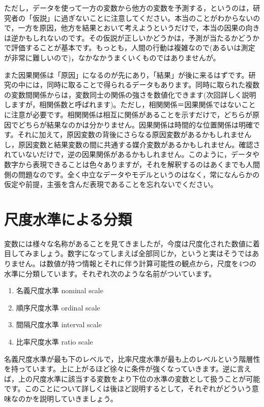 \documentclass{ltjsbook}
\begin{document}
ただし，データを使って一方の変数から他方の変数を予測する，というのは，研究者の「仮説」に過ぎないことに注意してください。本当のことがわからないので，一方を原因，他方を結果とおいて考えようというだけで，本当の因果の向きは逆かもしれないのです。その仮説が正しいかどうかは，予測が当たるかどうかで評価することが基本です。もっとも，人間の行動は複雑なので(あるいは測定が非常に難しいので)，なかなかうまくいくものではありませんが。

また因果関係は「原因」になるのが先にあり，「結果」が後に来るはずです。研究の中には，同時に取ることで得られるデータもあります。同時に取られた複数の変数間関係からは，変数同士の関係の強さを数値化できます(次回詳しく説明しますが，相関係数と呼ばれます)。ただし，相関関係＝因果関係ではないことに注意が必要です。相関関係は相互に関係があることを示すだけで，どちらが原因でどちらが結果なのかは分かりません。因果関係は時間的な位置関係は明確です。それに加えて，原因変数の背後にさらなる原因変数があるかもしれませんし，原因変数と結果変数の間に共通する媒介変数があるかもしれません。確認されていないだけで，逆の因果関係があるかもしれません。このように，データや数字から表現できることは色々ありますが，それを解釈するのはあくまでも人間側の問題なのです。全く中立なデータやモデルというのはなく，常になんらかの仮定や前提，主張を含んだ表現であることを忘れないでください。


\section{尺度水準による分類}

変数には様々な名称があることを見てきましたが，今度は尺度化された数値に着目してみましょう。数字になってしまえば全部同じか，というと実はそうではありません。\citet{stevens1946}は数値が持つ情報とそれに伴う計算可能性の観点から，尺度を4つの水準に分類しています。それぞれ次のような名前がついています。
\begin{enumerate}
    \item 名義尺度水準 nominal scale
    \item 順序尺度水準 ordinal scale
    \item 間隔尺度水準 interval scale
    \item 比率尺度水準 ratio scale
\end{enumerate}

名義尺度水準が最も下のレベルで，比率尺度水準が最も上のレベルという階層性を持っています。上に上がるほど徐々に条件が強くなっていきます。逆に言えば，上の尺度水準に該当する変数をより下位の水準の変数として扱うことが可能です。このことについて詳しくは後ほど説明するとして，それぞれがどういう意味なのかを説明していきましょう。
\end{document}
